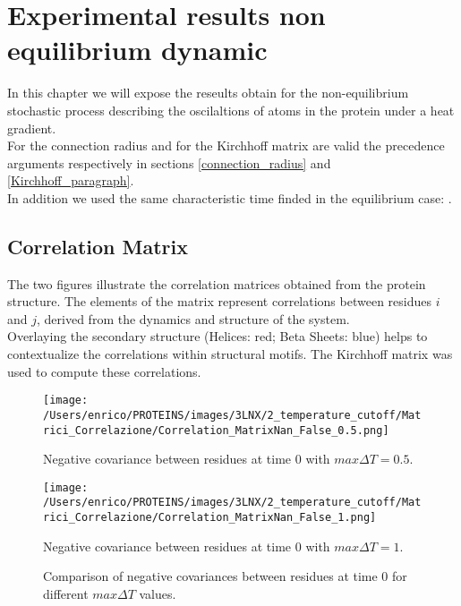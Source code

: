 \documentclass[English, Lau, oneside]{sapthesis}
\begin{document}
\newpage
\chapter{Experimental results non equilibrium dynamic}
In this chapter we will expose the reseults obtain for the non-equilibrium stochastic process describing the oscilaltions of atoms in the protein under a heat gradient.\\
For the connection radius and for the Kirchhoff matrix are valid the precedence arguments respectively in sections \ref{connection_radius} and \ref{Kirchhoff_paragraph}.\\
In addition we used the same characteristic time finded in the equilibrium case: .\\
\section{Correlation Matrix}
\noindent 
The two figures illustrate the correlation matrices obtained from the protein structure. The elements of the matrix represent correlations between residues \(i\) and \(j\), derived from the dynamics and structure of the system.\\
Overlaying the secondary structure (Helices: red; Beta Sheets: blue) helps to contextualize the correlations within structural motifs. The Kirchhoff matrix was used to compute these correlations.
\begin{figure}[h!]
    \centering
    \begin{minipage}{0.49\textwidth}
        \centering
        \texttt{[image: /Users/enrico/PROTEINS/images/3LNX/2\_temperature\_cutoff/Matrici\_Correlazione/Correlation\_MatrixNan\_False\_0.5.png]}
        \caption{Negative covariance between residues at time 0 with $max \Delta T = 0.5$.}
    \end{minipage}
    \hfill
    \begin{minipage}{0.49\textwidth}
        \centering
        \texttt{[image: /Users/enrico/PROTEINS/images/3LNX/2\_temperature\_cutoff/Matrici\_Correlazione/Correlation\_MatrixNan\_False\_1.png]}
        \caption{Negative covariance between residues at time 0 with $max \Delta T = 1$.}
    \end{minipage}
    \caption{Comparison of negative covariances between residues at time 0 for different $max \Delta T$ values.}
    \label{fig:correlation_comparison_out}

\end{figure}
\end{document}
